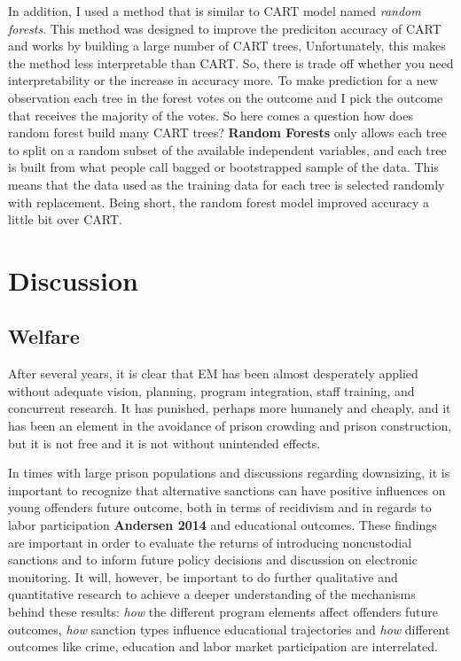 \documentclass[a4paper,12pt]{article}
\begin{document}
In addition, I used a method that is similar to CART model named \textit{random forests}. This method was designed to improve the prediciton accuracy of CART and works by building a large number of CART trees, Unfortunately, this makes the method less interpretable than CART. So, there is trade off whether you need interpretability or the increase in accuracy more. To make prediction for a new observation each tree in the forest votes on the outcome and I pick the outcome that  receives the majority of the votes. So here comes a question how does random forest build many CART trees? \textbf{Random Forests} only allows each tree to split on a random subset of the available independent variables, and each tree is built from what people call bagged or bootstrapped sample of the data. This means that the data used as the training data for each tree is selected randomly with replacement. Being short, the random forest model improved accuracy a little bit over CART. 



\newpage
\section{Discussion}
\subsection{Welfare}
After several years, it is clear that EM has been almost desperately applied without adequate vision, planning, program integration, staff training, and concurrent research. It has punished, perhaps more humanely and cheaply, and it has been an element in the avoidance of prison crowding and prison construction, but it is not free and it is not without unintended effects. 

In times with large prison populations and discussions regarding downsizing, it is important to recognize that alternative sanctions can have positive influences on young offenders future outcome, both in terms of recidivism and in regards to labor participation \textbf{Andersen 2014} \cite{Andersen2014} and educational outcomes. These findings are important in order to evaluate the returns of introducing noncustodial sanctions and to inform future policy decisions and discussion on electronic monitoring. It will, however, be important to do further qualitative and quantitative research to achieve a deeper understanding of the mechanisms behind these results: \textit{how} the different program elements affect offenders future outcomes, \textit{how} sanction types influence educational trajectories and \textit{how} different outcomes like crime, education and labor market participation are interrelated. 
\end{document}
